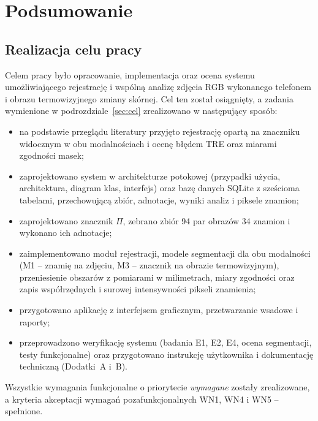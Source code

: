 
\chapter{Podsumowanie}
\label{chap:podsumowanie}

\section{Realizacja celu pracy}
\label{sec:realizacja}

Celem pracy było opracowanie, implementacja oraz ocena systemu umożliwiającego rejestrację i wspólną analizę zdjęcia RGB wykonanego telefonem i obrazu termowizyjnego zmiany skórnej. Cel ten został osiągnięty, a zadania wymienione w podrozdziale~\ref{sec:cel} zrealizowano w następujący sposób:
\begin{itemize}
  \item na podstawie przeglądu literatury przyjęto rejestrację opartą na znaczniku widocznym w obu modalnościach i ocenę błędem TRE oraz miarami zgodności masek;
  \item zaprojektowano system w architekturze potokowej (przypadki użycia, architektura, diagram klas, interfejs) oraz bazę danych SQLite z sześcioma tabelami, przechowującą zbiór, adnotacje, wyniki analiz i piksele znamion;
  \item zaprojektowano znacznik $\Pi$, zebrano zbiór 94 par obrazów 34 znamion i wykonano ich adnotacje;
  \item zaimplementowano moduł rejestracji, modele segmentacji dla obu modalności (M1 -- znamię na zdjęciu, M3 -- znacznik na obrazie termowizyjnym), przeniesienie obszarów z pomiarami w milimetrach, miary zgodności oraz zapis współrzędnych i surowej intensywności pikseli znamienia;
  \item przygotowano aplikację z interfejsem graficznym, przetwarzanie wsadowe i raporty;
  \item przeprowadzono weryfikację systemu (badania E1, E2, E4, ocena segmentacji, testy funkcjonalne) oraz przygotowano instrukcję użytkownika i dokumentację techniczną (Dodatki~A i~B).
\end{itemize}
Wszystkie wymagania funkcjonalne o priorytecie \emph{wymagane} zostały zrealizowane, a kryteria akceptacji wymagań pozafunkcjonalnych WN1, WN4 i WN5 -- spełnione.

